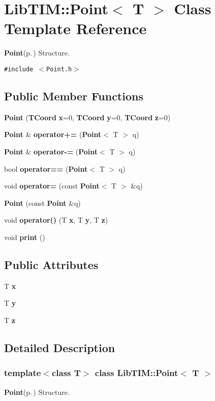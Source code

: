 \section{Lib\-TIM::Point$<$ T $>$ Class Template Reference}
\label{classLibTIM_1_1Point}
{\bf Point}{\rm (p.\,\pageref{classLibTIM_1_1Point})} Structure.  


{\tt \#include $<$Point.h$>$}

\subsection*{Public Member Functions}
\begin{CompactItemize}
\item 
{\bf Point} ({\bf TCoord} {\bf x}=0, {\bf TCoord} {\bf y}=0, {\bf TCoord} {\bf z}=0)
\item 
{\bf Point} \& {\bf operator+=} ({\bf Point}$<$ T $>$ q)
\item 
{\bf Point} \& {\bf operator-=} ({\bf Point}$<$ T $>$ q)
\item 
bool {\bf operator==} ({\bf Point}$<$ T $>$ q)
\item 
void {\bf operator=} (const {\bf Point}$<$ T $>$ \&q)
\item 
{\bf Point} (const {\bf Point} \&q)
\item 
void {\bf operator()} (T {\bf x}, T {\bf y}, T {\bf z})
\item 
void {\bf print} ()
\end{CompactItemize}
\subsection*{Public Attributes}
\begin{CompactItemize}
\item 
T {\bf x}
\item 
T {\bf y}
\item 
T {\bf z}
\end{CompactItemize}


\subsection{Detailed Description}
\subsubsection*{template$<$class T$>$ class Lib\-TIM::Point$<$ T $>$}

{\bf Point}{\rm (p.\,\pageref{classLibTIM_1_1Point})} Structure. 

